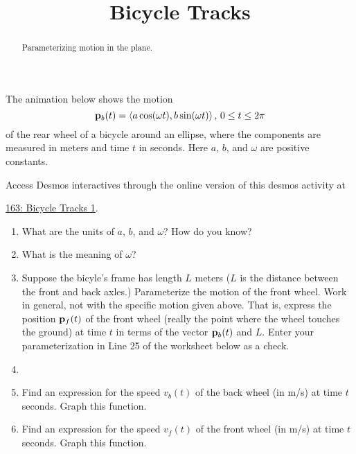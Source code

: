 \documentclass{ximera}
\title{Bicycle Tracks}
\begin{document}
\begin{abstract}
Parameterizing motion in the plane. 
\end{abstract}
\maketitle

\begin{exploration}  \label{E948959409303}

The animation below shows the motion
\[
   {\bf p}_b(t) = \langle a\cos (\omega t), b \sin (\omega t)  \rangle \, , \, 0\leq t \leq 2\pi 
\]
of the rear wheel of a bicycle around an ellipse, where the components are measured in meters and time $t$ in seconds.
Here $a$, $b$, and $\omega$ are positive constants.

\begin{onlineOnly}
    \begin{center}
\end{center}
\end{onlineOnly}

Access Desmos interactives through the online version of this desmos activity at
 
\href{https://www.desmos.com/calculator/cuo1lynesx}{163: Bicycle Tracks 1}.

\begin{enumerate}
\item What are the units of $a$, $b$, and $\omega$? How do you know?

\item  What is the meaning of $\omega$?

\item Suppose the bicyle's frame has length $L$ meters ($L$ is the distance between the front and back axles.) Parameterize the motion of the front wheel. Work in general, not with the specific motion given above. That is, express the position ${\bf p}_f(t)$
of the front wheel (really the point where the wheel touches the ground) at time $t$ in terms of the vector ${\bf p}_b(t)$ and $L$.
Enter your parameterization in Line 25 of the worksheet below as a check.

\item

\item Find an expression for the speed $v_b(t)$ of the back wheel (in m/s) at time $t$ seconds. Graph this function.

\item Find an expression for the speed $v_f(t)$ of the front wheel (in m/s) at time $t$ seconds. Graph this function.


\end{enumerate}
\end{exploration}
\end{document}
